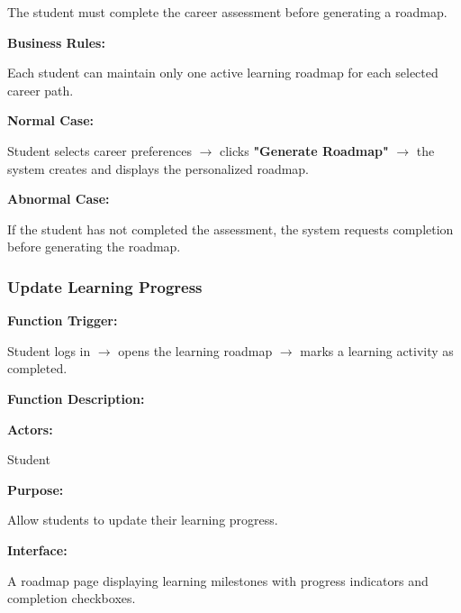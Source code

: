 The student must complete the career assessment before generating a roadmap.

\textbf{Business Rules:}

Each student can maintain only one active learning roadmap for each selected career path.

\textbf{Normal Case:}

Student selects career preferences $\rightarrow$ clicks \textbf{"Generate Roadmap"} $\rightarrow$ the system creates and displays the personalized roadmap.

\textbf{Abnormal Case:}

If the student has not completed the assessment, the system requests completion before generating the roadmap.

%

\subsubsection{Update Learning Progress}

\textbf{Function Trigger:}

Student logs in $\rightarrow$ opens the learning roadmap $\rightarrow$ marks a learning activity as completed.

\vspace{0.3cm}

\textbf{Function Description:}

\textbf{Actors:}

Student

\vspace{0.2cm}

\textbf{Purpose:}

Allow students to update their learning progress.

\vspace{0.2cm}

\textbf{Interface:}

A roadmap page displaying learning milestones with progress indicators and completion checkboxes.

